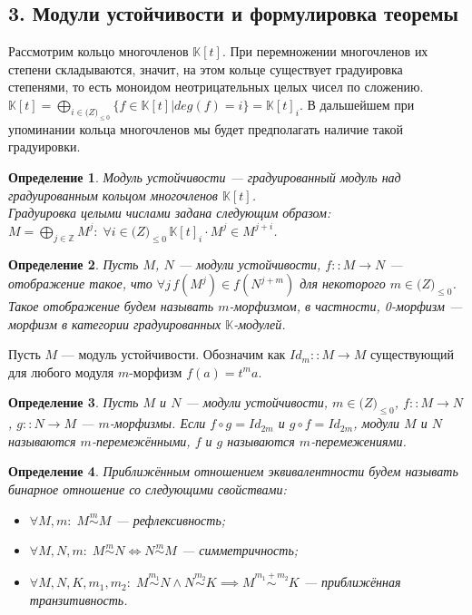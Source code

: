 \documentclass[a4paper,12pt]{report}
\newtheorem{definition}{Определение}
\begin{document}
\subsection*{3. Модули устойчивости и формулировка теоремы}
Рассмотрим кольцо многочленов $\mathbb{K}[t]$. При перемножении многочленов их степени складываются, значит, на этом кольце существует градуировка степенями, то есть моноидом неотрицательных целых чисел по сложению. $\mathbb{K}[t] = \bigoplus_{i \in \mathbb(Z)_{\leq 0}} \{f \in \mathbb{K}[t] | deg(f) = i\} = \mathbb{K}[t]_i$. В дальшейшем при упоминании кольца многочленов мы будет предполагать наличие такой градуировки.\\
\begin{definition}
  Модуль устойчивости --- градуированный модуль над градуированным кольцом многочленов $\mathbb{K}[t]$.\\
  Градуировка целыми числами задана следующим образом: $M = \bigoplus_{j \in \mathbb{Z}} M^j:\; \forall i \in \mathbb(Z)_{\leq 0}\, \mathbb{K}[t]_i \cdot M^j \in M^{j+i}$.
\end{definition}
\begin{definition}
  Пусть $M$, $N$ --- модули устойчивости, $f :: M \to N$ --- отображение такое, что $\forall j\, f(M^j) \in f(N^{j+m})$ для некоторого $m \in \mathbb(Z)_{\leq 0}$. Такое отображение будем называть $m$-морфизмом, в частности, 0-морфизм --- морфизм в категории градуированных $\mathbb{K}$-модулей.
\end{definition}
Пусть $M$ --- модуль устойчивости. Обозначим как $Id_m :: M \to M$ существующий для любого модуля $m$-морфизм $f(a) = t^ma$.\\
\begin{definition}
  Пусть $M$ и $N$ --- модули устойчивости, $m \in \mathbb(Z)_{\leq 0}$, $f :: M \to N$, $g :: N \to M$ --- $m$-морфизмы. Если $f \circ g = Id_{2m}$ и $g \circ f = Id_{2m}$, модули $M$ и $N$ называются $m$-перемежёнными, $f$ и $g$ называются $m$-перемежениями.
\end{definition}
\begin{definition}
  Приближённым отношением эквивалентности будем называть бинарное отношение со следующими свойствами:
  \begin{itemize}
    \item $\forall M,m:\; M \stackrel{m}{\sim} M$ --- рефлексивность;\\
    \item $\forall M,N,m:\; M \stackrel{m}{\sim} N \iff N \stackrel{m}{\sim} M$ --- симметричность;\\
    \item $\forall M,N,K,m_1,m_2:\; M \stackrel{m_1}{\sim} N \land N \stackrel{m_2}{\sim} K \implies M \stackrel{m_1 + m_2}{\sim} K$ --- приближённая транзитивность.\\
  \end{itemize}
\end{definition}
\end{document}
